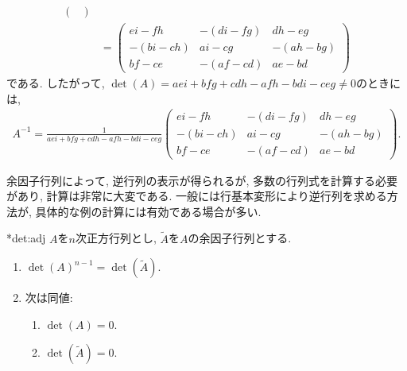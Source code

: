 \begin{example}
\begin{align*}
{\begin{pmatrix}
      \end{pmatrix}}\\
    &=
      \begin{pmatrix}
        ei-fh&
        -(di-fg)&
        dh-eg\\
        -(bi-ch)&
        ai-cg&
        -(ah-bg)\\
        bf-ce&
        -(af-cd)&
        ae-bd
      \end{pmatrix}
  \end{align*}
  である. したがって, $\det(A)=aei+bfg+cdh-afh-bdi-ceg\neq 0$のときには,
  \begin{align*}
    A^{-1}=\frac{1}{aei+bfg+cdh-afh-bdi-ceg}
      \begin{pmatrix}
        ei-fh&
        -(di-fg)&
        dh-eg\\
        -(bi-ch)&
        ai-cg&
        -(ah-bg)\\
        bf-ce&
        -(af-cd)&
        ae-bd
      \end{pmatrix}.
  \end{align*}
\end{example}

\begin{remark}
  余因子行列によって, 逆行列の表示が得られるが,
  多数の行列式を計算する必要があり,
  計算は非常に大変である.
  一般には行基本変形により逆行列を求める方法が,
  具体的な例の計算には有効である場合が多い.
\end{remark}

\begin{cor}
  \provelater**{det:adj}
  $A$を$n$次正方行列とし, $\tilde A$を$A$の余因子行列とする.
  \begin{enumerate}
  \item
    $\det(A)^{n-1}=\det(\tilde A)$.
  \item 次は同値:
    \begin{enumerate}
    \item $\det(A)=0$.
    \item $\det(\tilde A)=0$.
    \end{enumerate}
  \end{enumerate}
\end{cor}

